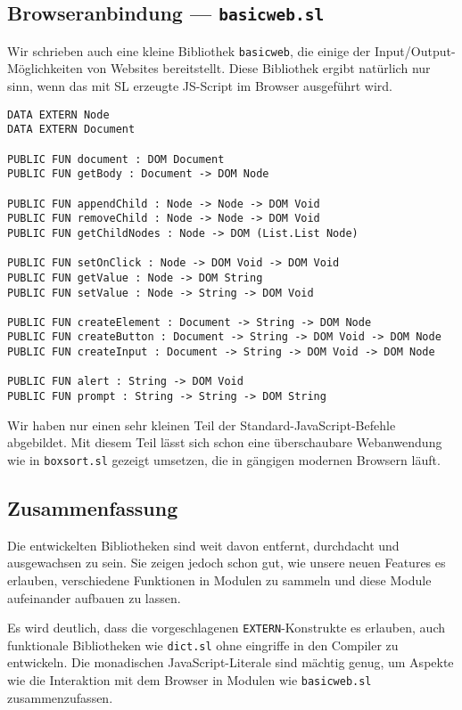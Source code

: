 \documentclass[runningheads]{llncs}
\begin{document}
\subsection{Browseranbindung --- \texttt{basicweb.sl}}

Wir schrieben auch eine kleine Bibliothek \verb|basicweb|, die einige der
Input/Output-Möglichkeiten von Websites bereitstellt. Diese Bibliothek ergibt
natürlich nur sinn, wenn das mit SL erzeugte JS-Script im Browser ausgeführt
wird.

\begin{verbatim}
DATA EXTERN Node
DATA EXTERN Document

PUBLIC FUN document : DOM Document
PUBLIC FUN getBody : Document -> DOM Node

PUBLIC FUN appendChild : Node -> Node -> DOM Void
PUBLIC FUN removeChild : Node -> Node -> DOM Void
PUBLIC FUN getChildNodes : Node -> DOM (List.List Node)

PUBLIC FUN setOnClick : Node -> DOM Void -> DOM Void
PUBLIC FUN getValue : Node -> DOM String
PUBLIC FUN setValue : Node -> String -> DOM Void

PUBLIC FUN createElement : Document -> String -> DOM Node
PUBLIC FUN createButton : Document -> String -> DOM Void -> DOM Node
PUBLIC FUN createInput : Document -> String -> DOM Void -> DOM Node

PUBLIC FUN alert : String -> DOM Void
PUBLIC FUN prompt : String -> String -> DOM String 
\end{verbatim}

Wir haben nur einen sehr kleinen Teil der Standard-JavaScript-Befehle
abgebildet. Mit diesem Teil lässt sich schon eine überschaubare Webanwendung
wie in \verb|boxsort.sl| gezeigt umsetzen, die in gängigen modernen Browsern
läuft.

\subsection{Zusammenfassung}

Die entwickelten Bibliotheken sind weit davon entfernt, durchdacht und
ausgewachsen zu sein. Sie zeigen jedoch schon gut, wie unsere neuen Features
es erlauben, verschiedene Funktionen in Modulen zu sammeln und diese Module
aufeinander aufbauen zu lassen.

Es wird deutlich, dass die vorgeschlagenen \verb|EXTERN|-Konstrukte es
erlauben, auch funktionale Bibliotheken wie \verb|dict.sl| ohne eingriffe
in den Compiler zu entwickeln. Die monadischen JavaScript-Literale sind
mächtig genug, um Aspekte wie die Interaktion mit dem Browser in Modulen
wie \verb|basicweb.sl| zusammenzufassen.
\end{document}
